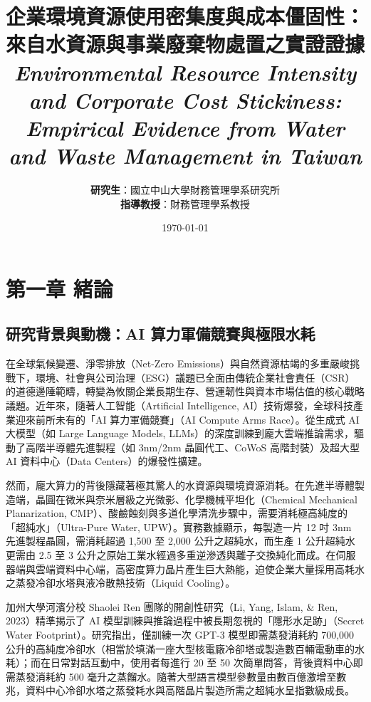\documentclass[12pt,a4paper]{article}
\title{\textbf{企業環境資源使用密集度與成本僵固性：\\來自水資源與事業廢棄物處置之實證證據}\\
\large\textit{Environmental Resource Intensity and Corporate Cost Stickiness:\\Empirical Evidence from Water and Waste Management in Taiwan}}
\author{\textbf{研究生}：國立中山大學財務管理學系研究所\\
\textbf{指導教授}：財務管理學系教授}
\date{\today}
\begin{document}
\maketitle
\newpage

\tableofcontents
\newpage

\listoftables
\newpage

\section{第一章 緒論}

\subsection{研究背景與動機：AI 算力軍備競賽與極限水耗}

在全球氣候變遷、淨零排放（Net-Zero Emissions）與自然資源枯竭的多重嚴峻挑戰下，環境、社會與公司治理（ESG）議題已全面由傳統企業社會責任（CSR）的道德邊陲範疇，轉變為攸關企業長期生存、營運韌性與資本市場估值的核心戰略議題。近年來，隨著人工智能（Artificial Intelligence, AI）技術爆發，全球科技產業迎來前所未有的「AI 算力軍備競賽」（AI Compute Arms Race）。從生成式 AI 大模型（如 Large Language Models, LLMs）的深度訓練到龐大雲端推論需求，驅動了高階半導體先進製程（如 3nm/2nm 晶圓代工、CoWoS 高階封裝）及超大型 AI 資料中心（Data Centers）的爆發性擴建。

然而，龐大算力的背後隱藏著極其驚人的水資源與環境資源消耗。在先進半導體製造端，晶圓在微米與奈米層級之光微影、化學機械平坦化（Chemical Mechanical Planarization, CMP）、酸鹼蝕刻與多道化學清洗步驟中，需要消耗極高純度的「超純水」（Ultra-Pure Water, UPW）。實務數據顯示，每製造一片 12 吋 3nm 先進製程晶圓，需消耗超過 1,500 至 2,000 公升之超純水，而生產 1 公升超純水更需由 2.5 至 3 公升之原始工業水經過多重逆滲透與離子交換純化而成。在伺服器端與雲端資料中心端，高密度算力晶片產生巨大熱能，迫使企業大量採用高耗水之蒸發冷卻水塔與液冷散熱技術（Liquid Cooling）。

加州大學河濱分校 Shaolei Ren 團隊的開創性研究（Li, Yang, Islam, \& Ren, 2023）精準揭示了 AI 模型訓練與推論過程中被長期忽視的「隱形水足跡」（Secret Water Footprint）。研究指出，僅訓練一次 GPT-3 模型即需蒸發消耗約 700,000 公升的高純度冷卻水（相當於填滿一座大型核電廠冷卻塔或製造數百輛電動車的水耗）；而在日常對話互動中，使用者每進行 20 至 50 次簡單問答，背後資料中心即需蒸發消耗約 500 毫升之蒸餾水。隨著大型語言模型參數量由數百億激增至數兆，資料中心冷卻水塔之蒸發耗水與高階晶片製造所需之超純水呈指數級成長。
\end{document}
